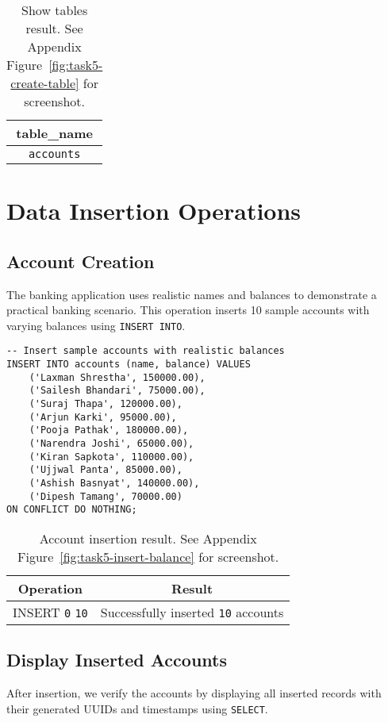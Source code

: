 \begin{table}[H]
  \centering
  \begin{tabular}{|c|}
    \hline
    \textbf{table\_name} \\
    \hline
    \texttt{accounts} \\
    \hline
  \end{tabular}
  \caption{Show tables result. See Appendix Figure~\ref{fig:task5-create-table} for screenshot.}
\end{table}

\section{Data Insertion Operations}

\subsection{Account Creation}
The banking application uses realistic names and balances to demonstrate a practical banking scenario. This operation inserts 10 sample accounts with varying balances using \texttt{INSERT INTO}.

\begin{verbatim}
-- Insert sample accounts with realistic balances
INSERT INTO accounts (name, balance) VALUES
    ('Laxman Shrestha', 150000.00),
    ('Sailesh Bhandari', 75000.00),
    ('Suraj Thapa', 120000.00),
    ('Arjun Karki', 95000.00),
    ('Pooja Pathak', 180000.00),
    ('Narendra Joshi', 65000.00),
    ('Kiran Sapkota', 110000.00),
    ('Ujjwal Panta', 85000.00),
    ('Ashish Basnyat', 140000.00),
    ('Dipesh Tamang', 70000.00)
ON CONFLICT DO NOTHING;
\end{verbatim}

\begin{table}[H]
  \centering
  \begin{tabular}{|c|c|}
    \hline
    \textbf{Operation} & \textbf{Result} \\
    \hline
    INSERT \texttt{0} \texttt{10} & Successfully inserted \texttt{10} accounts \\
    \hline
  \end{tabular}
  \caption{Account insertion result. See Appendix Figure~\ref{fig:task5-insert-balance} for screenshot.}
\end{table}

\subsection{Display Inserted Accounts}
After insertion, we verify the accounts by displaying all inserted records with their generated UUIDs and timestamps using \texttt{SELECT}.

